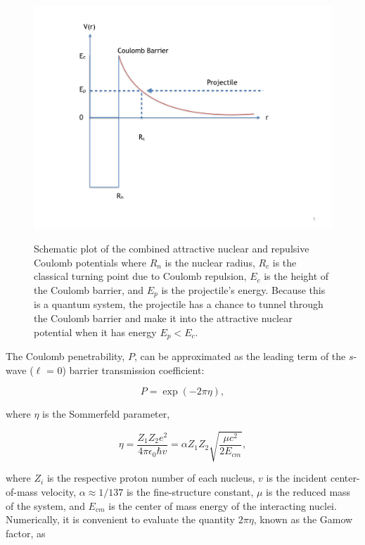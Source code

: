 \begin{figure}
\includegraphics[width=\linewidth]{figures/potentials.pdf}
\label{fig: potentials}
\caption{Schematic plot of the combined attractive nuclear and repulsive Coulomb potentials where $R_{n}$ is the nuclear radius, $R_{c}$ is the classical turning point due to Coulomb repulsion, $E_{c}$ is the height of the Coulomb barrier, and $E_{p}$ is the projectile's energy. Because this is a quantum system, the projectile has a chance to tunnel through the Coulomb barrier and make it into the attractive nuclear potential when it has energy $E_{p} < E_{c}$. }
\end{figure}

The Coulomb penetrability, $P$, can be approximated as the leading term of the $s$-wave ($\ell$ = 0) barrier transmission coefficient:

\begin{equation}
P = \exp(-2\pi\eta),
\end{equation}

\noindent where $\eta$ is the Sommerfeld parameter,

\begin{equation}
\eta = \dfrac{Z_{1}Z_{2}e^{2}}{4 \pi \epsilon_{0} \hbar v} = \alpha Z_{1} Z_{2} \sqrt{\dfrac{\mu c^{2}}{2E_{cm}}},
\end{equation}

\noindent where $Z_{i}$ is the respective proton number of each nucleus, $v$ is the incident center-of-mass velocity, $\alpha \approx 1/137$ is the fine-structure constant, $\mu$ is the reduced mass of the system, and $E_{cm}$ is the center of mass energy of the interacting nuclei. Numerically, it is convenient to evaluate the quantity $2\pi \eta$, known as the Gamow factor, as

